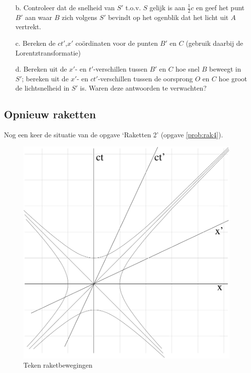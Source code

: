 \begin{itemize}
\item [b.]
  Controleer dat de snelheid van $S'$ t.o.v. $S$ gelijk is aan $\frac{1}{2}c$ 
  en geef 
het punt $B'$ aan waar 
  $B$ zich volgens $S'$ bevindt op het ogenblik dat het licht uit $A$ 
vertrekt. 
\item [c.]
  Bereken  de  $ct'$,$x'$  co\"{o}rdinaten  voor  de  punten  $B'$  en  $C$ 
(gebruik daarbij de Lorentztransformatie) 
\item [d.]
  Bereken uit de $x'$- en $t'$-verschillen tussen $B'$ en $C$ hoe snel $B$ 
beweegt in $S'$; bereken uit 
  de  $x'$-  en  $ct'$-verschillen  tussen de oorsprong $O$ en $C$ hoe groot 
de lichtsnelheid in $S'$ is. 
  Waren deze antwoorden te verwachten? 
\end{itemize}

\subsection{Opnieuw raketten}
Nog een keer de situatie van de opgave `Raketten 2' (opgave \ref{prob:rak4}).


\begin{figure}[ht]
\centering
\includegraphics[width=.8\textwidth]{oefeningen.pictures/oef_4/kleurplaat}
\caption{Teken raketbewegingen}
\label{f:kleurplaat2}
\end{figure}

